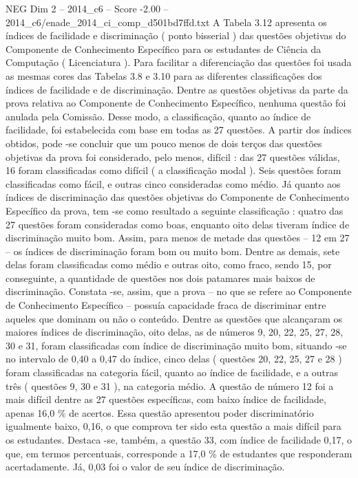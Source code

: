 \begin{textsample}{NEG Dim 2 – 2014\_c6 – Score -2.00 – 2014\_c6/enade\_2014\_ci\_comp\_d501bd7ffd.txt}
A Tabela 3.12 apresenta os índices de facilidade e discriminação ( ponto bisserial ) das questões objetivas do Componente de Conhecimento Específico para os estudantes de Ciência da Computação ( Licenciatura ).
Para facilitar a diferenciação das questões foi usada as mesmas cores das Tabelas 3.8 e 3.10 para as diferentes classificações dos índices de facilidade e de discriminação.
Dentre as questões objetivas da parte da prova relativa ao Componente de Conhecimento Específico, nenhuma questão foi anulada pela Comissão.
Desse modo, a classificação, quanto ao índice de facilidade, foi estabelecida com base em todas as 27 questões.
A partir dos índices obtidos, pode -se concluir que um pouco menos de dois terços das questões objetivas da prova foi considerado, pelo menos, difícil : das 27 questões válidas, 16 foram classificadas como difícil ( a classificação modal ).
Seis questões foram classificadas como fácil, e outras cinco consideradas como médio.
Já quanto aos índices de discriminação das questões objetivas do Componente de Conhecimento Específico da prova, tem -se como resultado a seguinte classificação : quatro das 27 questões foram consideradas como boas, enquanto oito delas tiveram índice de discriminação muito bom.
Assim, para menos de metade das questões – 12 em 27 – os índices de discriminação foram bom ou muito bom.
Dentre as demais, sete delas foram classificadas como médio e outras oito, como fraco, sendo 15, por conseguinte, a quantidade de questões nos dois patamares mais baixos de discriminação.
Constata -se, assim, que a prova – no que se refere ao Componente de Conhecimento Específico – possuía capacidade fraca de discriminar entre aqueles que dominam ou não o conteúdo.
Dentre as questões que alcançaram os maiores índices de discriminação, oito delas, as de números 9, 20, 22, 25, 27, 28, 30 e 31, foram classificadas com índice de discriminação muito bom, situando -se no intervalo de 0,40 a 0,47 do índice, cinco delas ( questões 20, 22, 25, 27 e 28 ) foram classificadas na categoria fácil, quanto ao índice de facilidade, e a outras três ( questões 9, 30 e 31 ), na categoria médio.
A questão de número 12 foi a mais difícil dentre as 27 questões específicas, com baixo índice de facilidade, apenas 16,0 \% de acertos.
Essa questão apresentou poder discriminatório igualmente baixo, 0,16, o que comprova ter sido esta questão a mais difícil para os estudantes.
Destaca -se, também, a questão 33, com índice de facilidade 0,17, o que, em termos percentuais, corresponde a 17,0 \% de estudantes que responderam acertadamente.
Já, 0,03 foi o valor de seu índice de discriminação.

\end{textsample}

